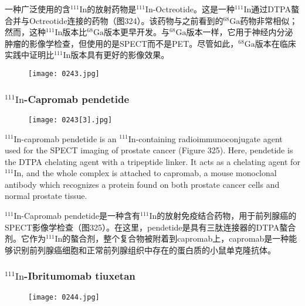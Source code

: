 \documentclass[dvipsnames, svgnames,a4paper,11pt]{article}
\begin{document}
一种广泛使用的含\(\mathrm{^{111}In}\)的放射药物是\(\mathrm{^{111}In}\)-Octreotide。这是一种\(\mathrm{^{111}In}\)通过DTPA螯合并与Octreotide连接的药物（图324）。该药物与之前看到的\(\mathrm{^{68}Ga}\)药物非常相似；然而，这种\(\mathrm{^{111}In}\)版本比\(\mathrm{^{68}Ga}\)版本更早开发。与\(\mathrm{^{68}Ga}\)版本一样，它用于神经内分泌肿瘤的影像学检查，但使用的是SPECT而不是PET。尽管如此，\(\mathrm{^{68}Ga}\)版本在临床实践中证明比\(\mathrm{^{111}In}\)版本具有更好的影像效果。

\begin{figure}[h]
	\centering
    \texttt{[image: 0243.jpg]}  
     \label{fig324}
\end{figure}


\subsubsection{\(\mathrm{^{111}In}\)-Capromab pendetide }  

\begin{figure}[h]
	\centering
    \texttt{[image: 0243[3].jpg]}  
     \label{fig325}
\end{figure}

\(\mathrm{^{111}In}\)-capromab pendetide is an \(\mathrm{^{111}In}\)-containing radioimmunoconjugate agent used for the SPECT imaging of prostate cancer (Figure 325). Here, pendetide is the DTPA chelating agent with a tripeptide linker. It acts as a chelating agent for \(\mathrm{^{111}In}\), and the whole complex is attached to capromab, a mouse monoclonal antibody which recognizes a protein found on both prostate cancer cells and normal prostate tissue.

\(\mathrm{^{111}In}\)-Capromab pendetide是一种含有\(\mathrm{^{111}In}\)的放射免疫结合药物，用于前列腺癌的SPECT影像学检查（图325）。在这里，pendetide是具有三肽连接器的DTPA螯合剂。它作为\(\mathrm{^{111}In}\)的螯合剂，整个复合物被附着到capromab上，capromab是一种能够识别前列腺癌细胞和正常前列腺组织中存在的蛋白质的小鼠单克隆抗体。

\subsubsection{\(\mathrm{^{111}In}\)-Ibritumomab tiuxetan}  
\begin{figure}[h]
	\centering
    \texttt{[image: 0244.jpg]}  
     \label{fig326}
\end{figure}
\end{document}
